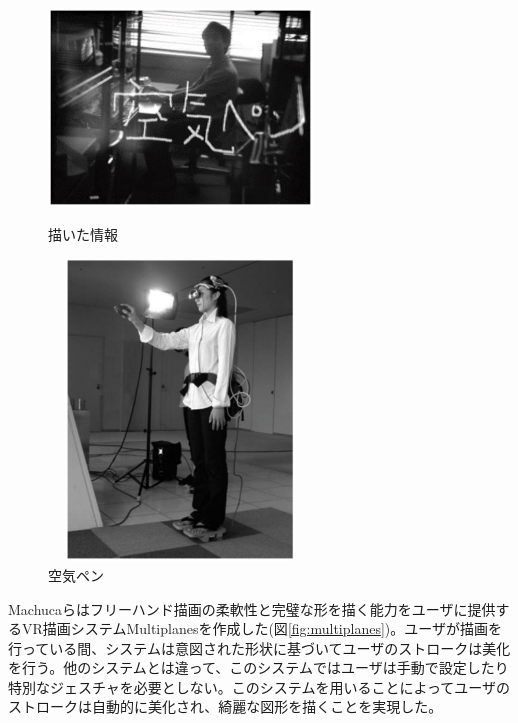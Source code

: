 \documentclass[11pt,a4j, titlepage]{jarticle} %
\begin{document}
\begin{figure}[H]
  \begin{center}
    \includegraphics[clip,height=6.0cm,width=7.0cm]{./tegakijouhou.eps}
    \caption{描いた情報}
    \label{fig:tegakijouhou}
  \end{center}
\end{figure}

\begin{figure}[H]
  \begin{center}
    \includegraphics[clip,height=8.0cm,width=7.0cm]{./kuukipen.eps}
    \caption{空気ペン}
    \label{fig:kuukipen}
  \end{center}
\end{figure}

Machucaら\cite{machuca}はフリーハンド描画の柔軟性と完璧な形を描く能力をユーザに提供するVR描画システムMultiplanesを作成した(図\ref{fig:multiplanes})。ユーザが描画を行っている間、システムは意図された形状に基づいてユーザのストロークは美化を行う。他のシステムとは違って、このシステムではユーザは手動で設定したり特別なジェスチャを必要としない。このシステムを用いることによってユーザのストロークは自動的に美化され、綺麗な図形を描くことを実現した。
\end{document}
